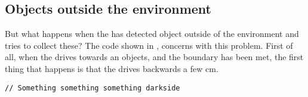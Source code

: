 
%
%	
%	
%
%


\subsection{Objects outside the environment}

But what happens when the \projname{} has detected object outside of the environment and tries to collect these? The code shown in , concerns with this problem. First of all, when the \projname{} drives towards an objects, and the boundary has been met, the first thing that happens is that the \projname{} drives backwards a few cm. 

\begin{lstlisting}[caption= Object navigation, label=lst:objectsoutsideboundary]
// Something something something darkside
\end{lstlisting}


